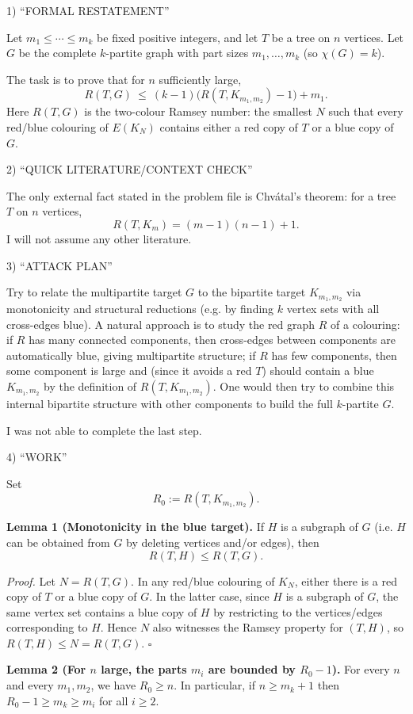 1) “FORMAL RESTATEMENT”

Let $m_1\le \cdots \le m_k$ be fixed positive integers, and let $T$ be a tree on $n$ vertices. Let $G$ be the complete $k$-partite graph with part sizes $m_1,\dots,m_k$ (so $\chi(G)=k$).

The task is to prove that for $n$ sufficiently large,
\[
R(T,G)\ \le\ (k-1)\bigl(R(T,K_{m_1,m_2})-1\bigr)+m_1.
\]
Here $R(T,G)$ is the two-colour Ramsey number: the smallest $N$ such that every red/blue colouring of $E(K_N)$ contains either a red copy of $T$ or a blue copy of $G$.

2) “QUICK LITERATURE/CONTEXT CHECK”

The only external fact stated in the problem file is Chv\'atal's theorem: for a tree $T$ on $n$ vertices,
\[
R(T,K_m)=(m-1)(n-1)+1.
\]
I will not assume any other literature.

3) “ATTACK PLAN”

Try to relate the multipartite target $G$ to the bipartite target $K_{m_1,m_2}$ via monotonicity and structural reductions (e.g. by finding $k$ vertex sets with all cross-edges blue). A natural approach is to study the red graph $R$ of a colouring: if $R$ has many connected components, then cross-edges between components are automatically blue, giving multipartite structure; if $R$ has few components, then some component is large and (since it avoids a red $T$) should contain a blue $K_{m_1,m_2}$ by the definition of $R(T,K_{m_1,m_2})$. One would then try to combine this internal bipartite structure with other components to build the full $k$-partite $G$.

I was not able to complete the last step.

4) “WORK”

Set
\[
R_0 := R(T,K_{m_1,m_2}).
\]

\textbf{Lemma 1 (Monotonicity in the blue target).}
If $H$ is a subgraph of $G$ (i.e. $H$ can be obtained from $G$ by deleting vertices and/or edges), then
\[
R(T,H)\le R(T,G).
\]

\emph{Proof.}
Let $N=R(T,G)$. In any red/blue colouring of $K_N$, either there is a red copy of $T$ or a blue copy of $G$. In the latter case, since $H$ is a subgraph of $G$, the same vertex set contains a blue copy of $H$ by restricting to the vertices/edges corresponding to $H$. Hence $N$ also witnesses the Ramsey property for $(T,H)$, so $R(T,H)\le N=R(T,G)$. $\square$

\textbf{Lemma 2 (For $n$ large, the parts $m_i$ are bounded by $R_0-1$).}
For every $n$ and every $m_1,m_2$, we have $R_0\ge n$. In particular, if $n\ge m_k+1$ then $R_0-1\ge m_k\ge m_i$ for all $i\ge 2$.

